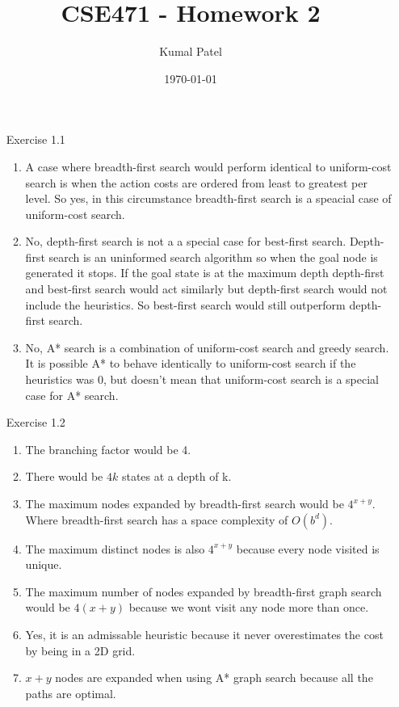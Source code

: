 \documentclass[letterpaper, 12pt]{article}
\title{CSE471 - Homework 2}
\author{Kumal Patel}
\date{\today}
\begin{document}
   
\maketitle

\begin{enumerate}
    \item[Exercise 1.1] 
    \begin{enumerate}
        \item A case where breadth-first search would perform identical to uniform-cost search is when the action costs are ordered from least to greatest per level. So yes, in this circumstance breadth-first search is a speacial case of uniform-cost search.
        \item No, depth-first search is not a a special case for best-first search. Depth-first search is an uninformed search algorithm so when the goal node is generated it stops. If the goal state is at the maximum depth depth-first and best-first search would act similarly but depth-first search would not include the heuristics. So best-first search would still outperform depth-first search.
        \item No, A* search is a combination of uniform-cost search and greedy search. It is possible A* to behave identically to uniform-cost search if the heuristics was 0, but doesn't mean that uniform-cost search is a special case for A* search.
    \end{enumerate} 
    \item[Exercise 1.2] 
    \begin{enumerate}
        \item The branching factor would be 4.
        \item There would be $4k$ states at a depth of k.
        \item The maximum nodes expanded by breadth-first search would be $4^{x+y}$. Where breadth-first search has a space complexity of $O(b^d)$.
        \item The maximum distinct nodes is also $4^{x+y}$ because every node visited is unique.
        \item The maximum number of nodes expanded by breadth-first graph search would be $4(x+y)$ because we wont visit any node more than once.
        \item Yes, it is an admissable heuristic because it never overestimates the cost by being in a 2D grid. 
        \item $x+y$ nodes are expanded when using A* graph search because all the paths are optimal.

\end{enumerate}
\end{enumerate}
\end{document}
